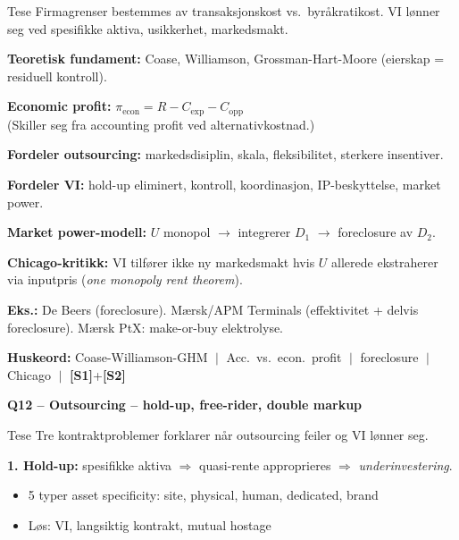 \documentclass[10pt, a4paper]{article}
\newcommand{\SOne}{\textcolor{s1color}{\textbf{[S1]}}}
\newcommand{\STwo}{\textcolor{s2color}{\textbf{[S2]}}}
\newcommand{\qhead}[2]{%
  \noindent
  \begin{tcolorbox}[colback=boxborder, colframe=boxborder, arc=2pt, left=6pt, right=6pt, top=2pt, bottom=2pt]
    \color{white}\textbf{\large Q#1 -- #2}
  \end{tcolorbox}
}
\newcommand{\huskeord}[1]{%
  \vspace{2pt}
  \begin{tcolorbox}[colback=yellow!15, colframe=orange!70!black, boxrule=0.4pt, arc=2pt, left=4pt, right=4pt, top=2pt, bottom=2pt]
    \footnotesize\textbf{Huskeord:} #1
  \end{tcolorbox}
}
\begin{document}
\begin{keybox}{Tese}
Firmagrenser bestemmes av transaksjonskost vs.\ byråkratikost. VI lønner seg ved spesifikke aktiva, usikkerhet, markedsmakt.
\end{keybox}

\textbf{Teoretisk fundament:} Coase, Williamson, Grossman-Hart-Moore (eierskap = residuell kontroll).

\begin{formulabox}
\textbf{Economic profit:} $\pi_{\text{econ}} = R - C_{\text{exp}} - C_{\text{opp}}$ \\
(Skiller seg fra accounting profit ved alternativkostnad.)
\end{formulabox}

\textbf{Fordeler outsourcing:} markedsdisiplin, skala, fleksibilitet, sterkere insentiver.

\textbf{Fordeler VI:} hold-up eliminert, kontroll, koordinasjon, IP-beskyttelse, market power.

\textbf{Market power-modell:} $U$ monopol $\to$ integrerer $D_1$ $\to$ foreclosure av $D_2$.

\textbf{Chicago-kritikk:} VI tilfører ikke ny markedsmakt hvis $U$ allerede ekstraherer via inputpris (\emph{one monopoly rent theorem}).

\textbf{Eks.:} De Beers (foreclosure). Mærsk/APM Terminals (effektivitet + delvis foreclosure). Mærsk PtX: make-or-buy elektrolyse.

\huskeord{Coase-Williamson-GHM $\;\big|\;$ Acc.\ vs.\ econ.\ profit $\;\big|\;$ foreclosure $\;\big|\;$ Chicago $\;\big|\;$ \SOne+\STwo}

\vfill\newpage

\qhead{12}{Outsourcing -- hold-up, free-rider, double markup}

\begin{keybox}{Tese}
Tre kontraktproblemer forklarer når outsourcing feiler og VI lønner seg.
\end{keybox}

\textbf{1. Hold-up:} spesifikke aktiva $\Rightarrow$ quasi-rente approprieres $\Rightarrow$ \emph{underinvestering}.
\begin{itemize}
  \item 5 typer asset specificity: site, physical, human, dedicated, brand
  \item Løs: VI, langsiktig kontrakt, mutual hostage
\end{itemize}
\end{document}
